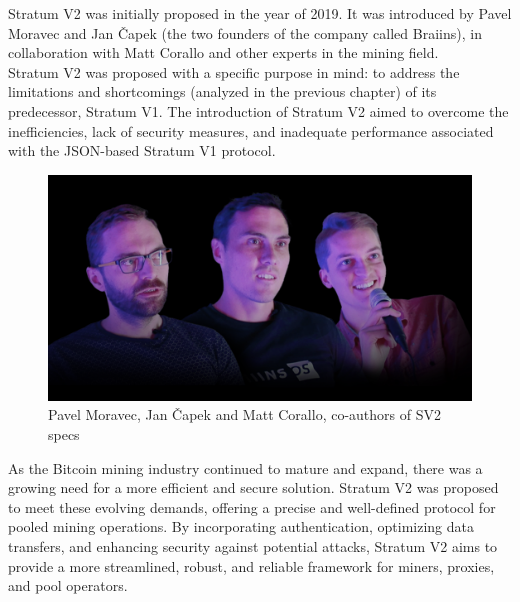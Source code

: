 Stratum V2 was initially proposed in the year of 2019. It was introduced by Pavel Moravec and Jan \v{C}apek (the two founders of the company called Braiins), in collaboration with Matt Corallo and other experts in the mining field. \\ Stratum V2 was proposed with a specific purpose in mind: to address the limitations and shortcomings (analyzed in the previous chapter) of its predecessor, Stratum V1. The introduction of Stratum V2 aimed to overcome the inefficiencies, lack of security measures, and inadequate performance associated with the JSON-based Stratum V1 protocol.

\begin{figure}[h!]
    \centering
    \includegraphics[width=15cm]{Figures/sv2/sv2_1.png}
    \caption{Pavel Moravec, Jan \v{C}apek and Matt Corallo, co-authors of SV2 specs}
    \label{fig:sv2_1}
\end{figure}

As the Bitcoin mining industry continued to mature and expand, there was a growing need for a more efficient and secure solution. Stratum V2 was proposed to meet these evolving demands, offering a precise and well-defined protocol for pooled mining operations. By incorporating authentication, optimizing data transfers, and enhancing security against potential attacks, Stratum V2 aims to provide a more streamlined, robust, and reliable framework for miners, proxies, and pool operators.

